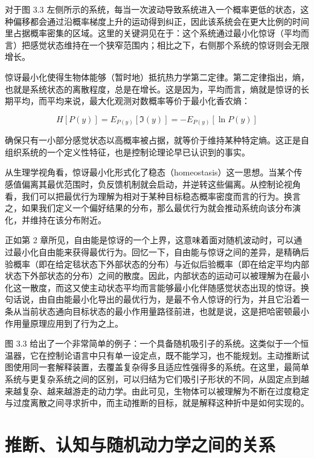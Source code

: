 对于图 3.3 左侧所示的系统，每当一次波动导致系统进入一个概率更低的状态，这种偏移都会通过沿概率梯度上升的运动得到纠正，因此该系统会在更大比例的时间里占据概率密集的区域。这里的关键洞见在于：这个系统通过最小化惊讶（平均而言）把感觉状态维持在一个狭窄范围内；相比之下，右侧那个系统的惊讶则会无限增长。

惊讶最小化使得生物体能够（暂时地）抵抗热力学第二定律。第二定律指出，熵，也就是系统状态的离散程度，总是在增长。这是因为，平均而言，熵就是惊讶的长期平均，而平均来说，最大化观测对数概率等价于最小化香农熵：

\begin{equation}
H[P(y)] = E_{P(y)}[\Im(y)] = -E_{P(y)}[\ln P(y)]
\tag{3.1}
\end{equation}

确保只有一小部分感觉状态以高概率被占据，就等价于维持某种特定熵。这正是自组织系统的一个定义性特征，也是控制论理论早已认识到的事实。

从生理学视角看，惊讶最小化形式化了稳态（homeostasis）这一思想。当某个传感值偏离其最优范围时，负反馈机制就会启动，并逆转这些偏离。从控制论视角看，我们可以把最优行为理解为相对于某种目标稳态概率密度而言的行为。换言之，如果我们定义一个偏好结果的分布，那么最优行为就会推动系统向该分布演化，并维持在该分布附近。

正如第 2 章所见，自由能是惊讶的一个上界，这意味着面对随机波动时，可以通过最小化自由能来获得最优行为。回忆一下，自由能与惊讶之间的差异，是精确后验概率（即在给定毯状态下外部状态的分布）与近似后验概率（即在给定平均内部状态下外部状态的分布）之间的散度。因此，内部状态的运动可以被理解为在最小化这一散度，而这又使主动状态平均而言能够最小化伴随感觉状态出现的惊讶。换句话说，由自由能最小化导出的最优行为，是最不令人惊讶的行为，并且它沿着一条从当前状态通向目标状态的最小作用量路径前进，也就是说，这是把哈密顿最小作用量原理应用到了行为之上。

图 3.3 给出了一个非常简单的例子：一个具备随机吸引子的系统。这类似于一个恒温器，它在控制论语言中只有单一设定点，既不能学习，也不能规划。主动推断试图使用同一套解释装置，去覆盖复杂得多且适应性强得多的系统。在这里，最简单系统与更复杂系统之间的区别，可以归结为它们吸引子形状的不同，从固定点到越来越复杂、越来越游走的动力学。由此可见，生物体可以被理解为不断在过度稳定与过度离散之间寻求折中，而主动推断的目标，就是解释这种折中是如何实现的。

\section{推断、认知与随机动力学之间的关系}

